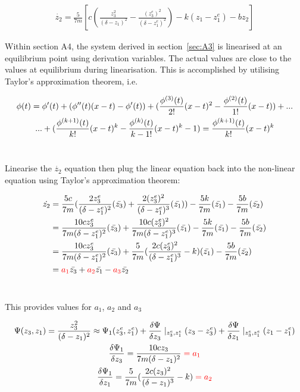 \documentclass[a4paper,10pt,reqno]{amsart}
\numberwithin{equation}{section}
\begin{document}
\begin{gather}
    \dot{z_2} = \frac{5}{7m}[c(\frac{z_3^2}{(\delta-z_1)^2}-\frac{(z_3^e)^2}{(\delta-z_1^e)^2})-k(z_1-z_1^e)-bz_2]
\end{gather}

\par Within section A4, the system derived in section~\ref{sec:A3} is linearised at an equilibrium point using derivation variables. The actual values are close to the values at equilibrium during linearisation. This is accomplished by utilising Taylor's approximation theorem, i.e.

\begin{gather}
    \phi(t)=\phi'(t)+(\phi''(t)(x-t)-\phi'(t))+(\frac{\phi^{(3)}(t)}{2!}(x-t)^2-\frac{\phi^{(2)}(t)}{1!}(x-t))+...
    \notag\\
    ...+(\frac{\phi^{(k+1)}(t)}{k!}(x-t)^k - \frac{\phi^{(k)}(t)}{k-1!}(x-t)^k-1) = \frac{\phi^{(k+1)}(t)}{k!}(x-t)^k
\end{gather}
\\
\par Linearise the $\dot{z_2}$ equation then plug the linear equation back into the non-linear equation using Taylor's approximation theorem:


\begin{align}
    \dot{z_2}&=\frac{5c}{7m}(\frac{2z_3^e}{(\delta-z_1^e)^2}(\bar{z_3})+\frac{2(z_3^e)^2}{(\delta-z_1^e)^3}(\bar{z_1}))-\frac{5k}{7m}(\bar{z_1})-\frac{5b}{7m}(\bar{z_2})
    \\
    &=\frac{10cz_3^e}{7m(\delta-z_1^e)^2}(\bar{z_3})+\frac{10c(z_3^e)^2}{7m(\delta-z_1^e)^3}(\bar{z_1})-\frac{5k}{7m}(\bar{z_1})-\frac{5b}{7m}(\bar{z_2})
    \\
    &=\frac{10cz_3^e}{7m(\delta-z_1^e)^2}(\bar{z_3})+\frac{5}{7m}(\frac{2c(z_3^e)^2}{(\delta-z_1^e)^3}-k)(\bar{z_1})-\frac{5b}{7m}(\bar{z_2})
    \\
    &=\color{red}a_1\color{black}\bar{z_3} + \color{red}a_2\color{black}\bar{z_1} - \color{red}a_3\color{black}\bar{z_2}
\end{align}
\\
\par This provides values for \color{red}$a_1$\color{black}, \color{red}$a_2$ \color{black}and \color{red}$a_3$\color{black}

\begin{gather}
    \Psi(z_3,z_1)=\frac{z_3^2}{(\delta-z_1)^2}\approx\Psi_1(z_3^e,z_1^e)+\frac{\delta\Psi}{\delta z_3}\mid_{z_3^e,z_1^e}(z_3-z_3^e)+\frac{\delta\Psi}{\delta z_1}\mid_{z_3^e,z_1^e}(z_1-z_1^e)
    \notag\\
    \frac{\delta\Psi_1}{\delta z_3}=\frac{10cz_3}{7m(\delta-z_1)^2}\color{red}=a_1\color{black}
    \notag\\
    \frac{\delta\Psi_1}{\delta z_1}=\frac{5}{7m}(\frac{2c(z_3)^2}{(\delta-z_1)^3}-k)\color{red}=a_2\color{black}
\end{gather}
\end{document}
